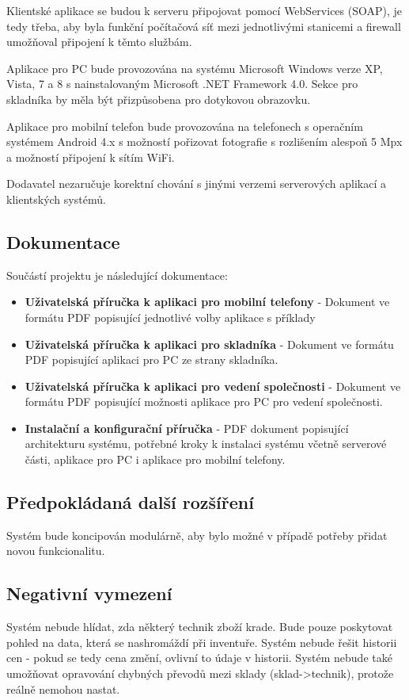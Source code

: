 \documentclass[a4paper,10pt]{article}
\begin{document}
Klientské aplikace se budou k serveru připojovat pomocí WebServices (SOAP), je tedy třeba, aby byla funkční počítačová síť mezi jednotlivými stanicemi a firewall umožňoval připojení k těmto službám.

Aplikace pro PC bude provozována na systému Microsoft Windows verze XP, Vista, 7 a 8 s nainstalovaným Microsoft .NET Framework 4.0. Sekce pro skladníka by měla být přizpůsobena pro dotykovou obrazovku.

Aplikace pro mobilní telefon bude provozována na telefonech s operačním systémem Android 4.x s možností pořizovat fotografie s rozlišením alespoň 5 Mpx a možností připojení k sítím WiFi.

Dodavatel nezaručuje korektní chování s jinými verzemi serverových aplikací a klientských systémů.

\subsection{Dokumentace}
Součástí projektu je následující dokumentace:
\begin{itemize}
	\item \textbf{Uživatelská příručka k aplikaci pro mobilní telefony} - Dokument ve formátu PDF popisující jednotlivé volby aplikace s příklady
	\item \textbf{Uživatelská příručka k aplikaci pro skladníka} - Dokument ve formátu PDF popisující aplikaci pro PC ze strany skladníka. 
	\item \textbf{Uživatelská příručka k aplikaci pro vedení společnosti} - Dokument ve formátu PDF popisující možnosti aplikace pro PC pro vedení společnosti.
	\item \textbf{Instalační a konfigurační příručka} - PDF dokument popisující architekturu systému, potřebné kroky k instalaci systému včetně serverové části, aplikace pro PC i aplikace pro mobilní telefony.
\end{itemize}

\subsection{Předpokládaná další rozšíření}
Systém bude koncipován modulárně, aby bylo možné v případě potřeby přidat novou funkcionalitu.

\subsection{Negativní vymezení}
Systém nebude hlídat, zda některý technik zboží krade. Bude pouze poskytovat pohled na data, která se nashromáždí při inventuře. Systém nebude řešit historii cen - pokud se tedy cena změní, ovlivní to údaje v historii. Systém nebude také umožňovat opravování chybných převodů mezi sklady (sklad->technik), protože reálně nemohou nastat.
\end{document}

